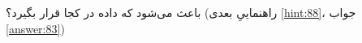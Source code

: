 \section{}
\paragraph{}\label{hint:197}
 باعث می‌شود که داده در کجا قرار بگیرد؟ (راهنماییِ بعدی \ref{hint:88}، جواب \ref{answer:83})